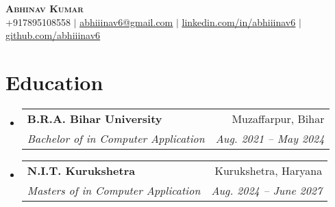 \documentclass[letterpaper,11pt]{article}
\makeatletter
\newcommand{\resumeItem}[1]{
  \item\small{
    {#1 \vspace{-2pt}}
  }
}
\newcommand{\resumeSubheading}[4]{
  \vspace{-2pt}\item
    \begin{tabular*}{0.97\textwidth}[t]{l@{\extracolsep{\fill}}r}
      \textbf{#1} & #2 \\
      \textit{\small#3} & \textit{\small #4} \\
    \end{tabular*}\vspace{-7pt}
}
\newcommand{\resumeSubSubheading}[2]{
    \item
    \begin{tabular*}{0.97\textwidth}{l@{\extracolsep{\fill}}r}
      \textit{\small#1} & \textit{\small #2} \\
    \end{tabular*}\vspace{-7pt}
}
\newcommand{\resumeSubHeadingListStart}{\begin{itemize}[leftmargin=0.15in, label={}]}
\newcommand{\resumeSubHeadingListEnd}{\end{itemize}}
\newcommand{\resumeItemListStart}{\begin{itemize}}
\newcommand{\resumeItemListEnd}{\end{itemize}\vspace{-5pt}}
\makeatother
\begin{document}

\begin{center}
    \textbf{\Huge \scshape Abhinav Kumar} \\ \vspace{1pt}
    \small +917895108558 $|$ \href{mailto:abhiiinav6@gmail.com}{\underline{abhiiinav6@gmail.com}} $|$ 
    \href{https://www.linkedin.com/in/abhiiinav6/}{\underline{linkedin.com/in/abhiiinav6}} $|$
    \href{https://github.com/abhiiinav6}{\underline{github.com/abhiiinav6}}
\end{center}


\section{Education}
  \resumeSubHeadingListStart
    \resumeSubheading
      {B.R.A. Bihar University}{Muzaffarpur, Bihar}
      {Bachelor of in Computer Application}{Aug. 2021 -- May 2024}
    \resumeSubheading
      {N.I.T. Kurukshetra}{Kurukshetra, Haryana}
      {Masters of in Computer Application}{Aug. 2024 -- June 2027}
  \resumeSubHeadingListEnd



      
\end{document}
